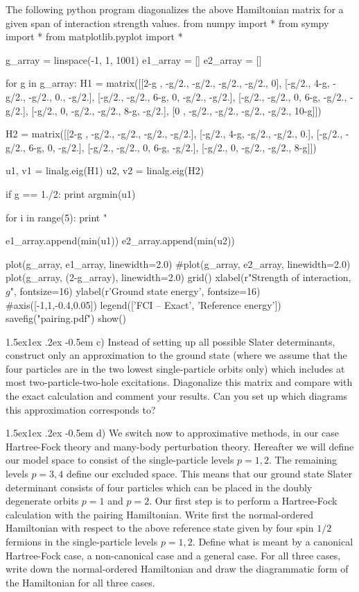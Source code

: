 \documentclass[%
twoside,                 %
final,                   %
10pt]{article}
\makeatletter
\newenvironment{doconceexercise}{}{}
\newcommand\subex{\@startsection{paragraph}{4}{\z@}%
                  {1.5ex\@plus1ex \@minus.2ex}%
                  {-0.5em}%
                  {\normalfont\normalsize\bfseries}}
\makeatother
\begin{document}
\begin{doconceexercise}
The following python program diagonalizes the above Hamiltonian matrix for a given span of interaction strength values.
\bpypro
from numpy import *
from sympy import *
from matplotlib.pyplot import *


g_array = linspace(-1, 1, 1001)
e1_array = []
e2_array = []

for g in g_array:
	H1 = matrix([[2-g , -g/2.,  -g/2., -g/2., -g/2.,     0], 
		        [-g/2.,   4-g,  -g/2., -g/2.,    0., -g/2.],
		        [-g/2., -g/2.,    6-g,     0, -g/2., -g/2.],
				[-g/2., -g/2.,      0,   6-g, -g/2., -g/2.],
				[-g/2.,     0,  -g/2., -g/2.,   8-g, -g/2.],
				[0    , -g/2.,  -g/2., -g/2., -g/2.,  10-g]]) 

	H2 = matrix([[2-g , -g/2.,  -g/2., -g/2., -g/2.], 
		        [-g/2.,   4-g,  -g/2., -g/2.,    0.],
		        [-g/2., -g/2.,    6-g,     0, -g/2.],
				[-g/2., -g/2.,      0,   6-g, -g/2.],
				[-g/2.,     0,  -g/2., -g/2.,   8-g]]) 

		

	u1, v1 = linalg.eig(H1)
	u2, v2 = linalg.eig(H2)

	if g == 1./2:
		print argmin(u1)

		for i in range(5):
			print " %



	e1_array.append(min(u1))
	e2_array.append(min(u2))


plot(g_array, e1_array, linewidth=2.0)
#plot(g_array, e2_array, linewidth=2.0)
plot(g_array, (2-g_array), linewidth=2.0)
grid()
xlabel(r"Strength of interaction, $g$", fontsize=16)
ylabel(r'Ground state energy', fontsize=16)
#axis([-1,1,-0.4,0.05])
legend(['FCI -- Exact', 'Reference energy'])
savefig("pairing.pdf")
show()
\epypro


\subex{c)}
Instead of setting up all possible Slater determinants, construct only
an approximation to the ground state (where we assume that the four
particles are in the two lowest single-particle orbits only) which
includes at most two-particle-two-hole excitations. Diagonalize this
matrix and compare with the exact calculation and comment your
results. Can you set up which diagrams this approximation corresponds
to?


\subex{d)}
We switch now to approximative methods, in our case Hartree-Fock
  theory and many-body perturbation theory. Hereafter we will define
  our model space to consist of the single-particle levels $p=1,2$.
  The remaining levels $p=3,4$ define our excluded space.  This means
  that our ground state Slater determinant consists of four particles
  which can be placed in the doubly degenerate orbits $p=1$ and $p=2$.
  Our first step is to perform a Hartree-Fock calculation with the
  pairing Hamiltonian.  Write first the normal-ordered Hamiltonian
  with respect to the above reference state given by four spin $1/2$
  fermions in the single-particle levels $p=1,2$. Define what is meant
  by a canonical Hartree-Fock case, a non-canonical case and a general
  case.  For all three cases, write down the normal-ordered
  Hamiltonian and draw the diagrammatic form of the Hamiltonian for all three cases.




\end{doconceexercise}
\end{document}
